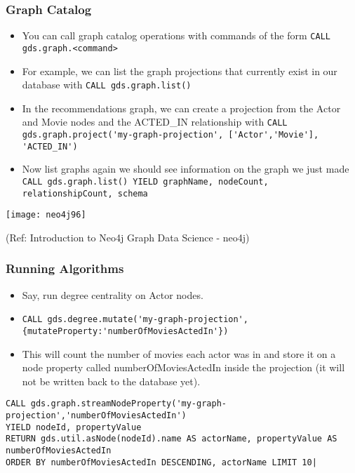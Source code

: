 \begin{frame}[fragile]\frametitle{Graph Catalog}

\begin{itemize}
\item You can call graph catalog operations with commands of the form \lstinline|CALL gds.graph.<command>|
\item For example, we can list the graph projections that currently exist in our database with  \lstinline|CALL gds.graph.list()|
\item In the recommendations graph, we can create a projection from the Actor and Movie nodes and the ACTED\_IN relationship with \lstinline|CALL gds.graph.project('my-graph-projection', ['Actor','Movie'], 'ACTED_IN')|
\item Now list graphs again we should see information on the graph we just made \lstinline|CALL gds.graph.list() YIELD graphName, nodeCount, relationshipCount, schema|
\end{itemize}

\begin{center}
\texttt{[image: neo4j96]}
\end{center}	

{\tiny (Ref: Introduction to Neo4j Graph Data Science - neo4j)}
\end{frame}

\begin{frame}[fragile]\frametitle{Running Algorithms}

\begin{itemize}
\item Say, run degree centrality on Actor nodes. 
\item \lstinline|CALL gds.degree.mutate('my-graph-projection', {mutateProperty:'numberOfMoviesActedIn'})|
\item This will count the number of movies each actor was in and store it on a node property called numberOfMoviesActedIn inside the projection (it will not be written back to the database yet).
\end{itemize}

\begin{lstlisting}
CALL gds.graph.streamNodeProperty('my-graph-projection','numberOfMoviesActedIn')
YIELD nodeId, propertyValue
RETURN gds.util.asNode(nodeId).name AS actorName, propertyValue AS numberOfMoviesActedIn
ORDER BY numberOfMoviesActedIn DESCENDING, actorName LIMIT 10| 
\end{lstlisting}

\end{frame}

